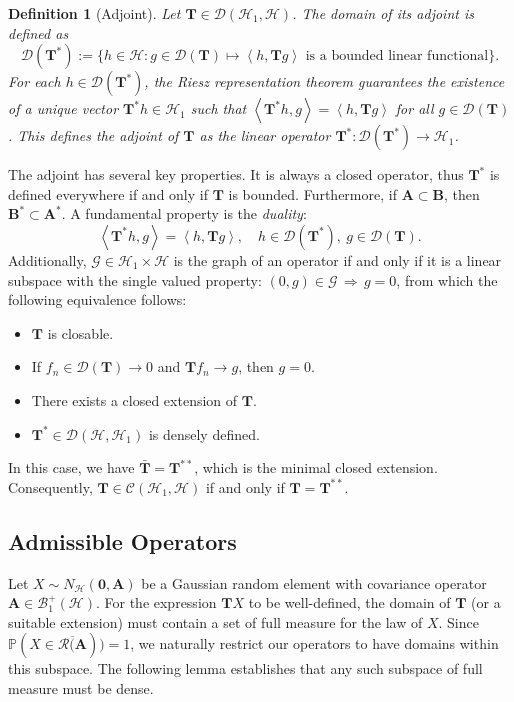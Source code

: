 \documentclass[noinfoline]{imsart}\setcounter{tocdepth}{2}
\renewcommand{\b}[1]{\mathbb{#1}} %
\newcommand{\m}[1]{\mathbf{#1}} %
\renewcommand{\c}[1]{\mathcal{#1}} %
\newcommand{\innpr}[2]{{\left\langle {#1},{#2}\right\rangle}} %
\theoremstyle{plain}
\newtheorem{definition}{Definition}[section]
\begin{document}
\begin{definition}[Adjoint]
Let $\m{T} \in \c{D}(\c{H}_{1}, \c{H})$. The domain of its adjoint is defined as
\begin{equation*}
    \c{D}(\m{T}^{*}) := \{h \in \c{H}: g \in \c{D}(\m{T}) \mapsto \innpr{h}{\m{T}g} \text{ is a bounded linear functional} \}.
\end{equation*}
For each $h \in \c{D}(\m{T}^{*})$, the Riesz representation theorem guarantees the existence of a unique vector $\m{T}^{*} h \in \c{H}_{1}$ such that $\innpr{\m{T}^{*} h}{g} = \innpr{h}{\m{T} g}$ for all $g \in \c{D}(\m{T})$. This defines the \emph{adjoint} of $\m{T}$ as the linear operator $\m{T}^{*}: \c{D}(\m{T}^{*}) \to \c{H}_{1}$.
\end{definition}

The adjoint has several key properties. It is always a closed operator, thus $\m{T}^{*}$ is defined everywhere if and only if $\m{T}$ is bounded. Furthermore, if $\m{A} \subset \m{B}$, then $\m{B}^{*} \subset \m{A}^{*}$. A fundamental property is the \emph{duality}:
\begin{equation}\label{eq:adj:dual}
    \innpr{\m{T}^{*} h}{g} = \innpr{h}{\m{T} g}, \quad h \in \c{D}(\m{T}^{*}), \ g \in \c{D}(\m{T}).
\end{equation}
Additionally, $\c{G} \in \c{H}_{1} \times \c{H}$ is the graph of an operator if and only if it is a linear subspace with the single valued property: $(0, g) \in \c{G} \, \Rightarrow \, g =0$, from which the following equivalence follows:
\begin{itemize}
    \item $\m{T}$ is closable.
    \item If $f_{n} \in \c{D}(\m{T}) \to 0$ and $\m{T} f_{n} \to g$, then $g = 0$.
    \item There exists a closed extension of $\m{T}$.
    \item $\m{T}^{*} \in \c{D}(\c{H}, \c{H}_{1})$ is densely defined.
\end{itemize}
In this case, we have $\bar{\m{T}} = \m{T}^{**}$, which is the minimal closed extension. Consequently, $\m{T} \in \c{C}(\c{H}_{1}, \c{H})$ if and only if $\m{T} = \m{T}^{**}$. 


\subsection{Admissible Operators}\label{ssec:admiss}
Let $X \sim N_{\c{H}}(\m{0}, \m{A})$ be a Gaussian random element  with covariance operator $\m{A} \in \c{B}_{1}^{+}(\c{H})$. For the expression $\m{T} X$ to be well-defined, the domain of $\m{T}$ (or a suitable extension) must contain a set of full measure for the law of $X$. Since $\b{P}(X \in \overline{\c{R}(\m{A}})) = 1$, we naturally restrict our operators to have domains within this subspace. The following lemma establishes that any such subspace of full measure must be dense.
\end{document}
